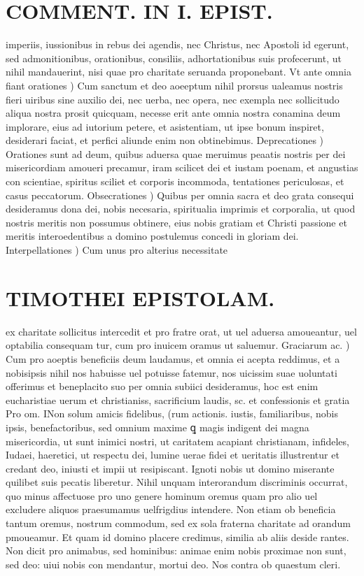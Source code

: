 \documentclass{article}
\begin{document}
\begin{pages}
\section*{COMMENT. IN I. EPIST. }
\marginpar{[ p.42 ]}\pstart imperiis, iussionibus in rebus dei agendis, nec Christus, nec Apostoli id egerunt, sed admonitionibus, orationibus, consiliis, adhortationibus suis profecerunt, ut nihil mandauerint, nisi quae pro charitate seruanda proponebant.  \pend\pstart Vt ante omnia fiant orationes ) Cum sanctum et deo aoeeptum nihil prorsus ualeamus nostris fieri uiribus sine auxilio dei, nec uerba, nec opera, nec exempla nec sollicitudo aliqua nostra prosit quicquam, necesse erit ante omnia nostra conamina deum implorare, eius ad iutorium petere, et asistentiam, ut ipse bonum inspiret, desiderari faciat, et perfici aliunde enim non obtinebimus.  \pend\pstart Deprecationes ) Orationes sunt ad deum, quibus aduersa quae meruimus peaatis nostris per dei misericordiam amoueri precamur, iram scilicet dei et iustam poenam, et angustias con scientiae, spiritus sciliet et corporis incommoda, tentationes periculosas, et casus peccatorum.  \pend\pstart Obsecrationes ) Quibus per omnia sacra et deo grata consequi desideramus dona dei, nobis necesaria, spiritualia imprimis et corporalia, ut quod nostris meritis non possumus obtinere, eius nobis gratiam et Christi passione et meritis interoedentibus a domino postulemus concedi in gloriam dei.  \pend\pstart Interpellationes ) Cum unus pro alterius necessitate  \pend
\section*{TIMOTHEI EPISTOLAM. }
\marginpar{[ p.43 ]}\pstart ex charitate sollicitus intercedit et pro fratre orat, ut uel aduersa amoueantur, uel optabilia consequam tur, cum pro inuicem oramus ut saluemur. Graciarum ac. ) Cum pro aoeptis beneficiis deum laudamus, et omnia ei acepta reddimus, et a nobisipsis nihil nos habuisse uel potuisse fatemur, nos uicissim suae uoluntati offerimus et beneplacito suo per omnia subiici desideramus, hoc est enim eucharistiae uerum et christianiss, sacrificium laudis, sc. et confessionis et gratia Pro om. INon solum amicis fidelibus, (rum actionis. iustis, familiaribus, nobis ipsis, benefactoribus, sed omnium maxime ꝗ magis indigent dei magna misericordia, ut sunt inimici nostri, ut caritatem acapiant christianam, infideles, Iudaei, haeretici, ut respectu dei, lumine uerae fidei et ueritatis illustrentur et credant deo, iniusti et impii ut resipiscant. Ignoti nobis ut domino miserante quilibet suis pecatis liberetur. Nihil unquam interorandum discriminis occurrat, quo minus affectuose pro uno genere hominum oremus quam pro alio uel excludere aliquos praesumamus uelfrigdius intendere. Non etiam ob beneficia tantum oremus, nostrum commodum, sed ex sola fraterna charitate ad orandum pmoueamur. Et quam id domino placere credimus, similia ab aliis deside rantes. Non dicit pro animabus, sed hominibus: animae enim nobis proximae non sunt, sed deo: uiui nobis con mendantur, mortui deo. Nos contra ob quaestum cleri.  \pend

\end{pages}
\end{document}
